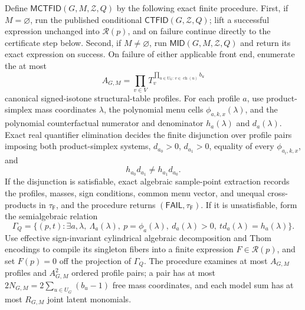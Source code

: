 Define \(\mathsf{MCTFID}(G,M,\mathcal Z,Q)\) by the following exact finite procedure.  First, if \(M=\varnothing\), run the published conditional \(\mathsf{CTFID}(G,\mathcal Z,Q)\); lift a successful expression unchanged into \(\mathcal R(p)\), and on failure continue directly to the certificate step below.  Second, if \(M\ne\varnothing\), run \(\mathsf{MID}(G,M,\mathcal Z,Q)\) and return its exact expression on success.  On failure of either applicable front end, enumerate the at most
\[
 A_{G,M}=\prod_{v\in V}T_v^{\prod_{u\in U_G:\,v\in\operatorname{ch}(u)}b_u}
\]
canonical signed-isotone structural-table profiles.  For each profile \(a\), use product-simplex mass coordinates \(\lambda\), the polynomial menu cells \(\phi_{a,k,x}(\lambda)\), and the polynomial counterfactual numerator and denominator \(h_a(\lambda)\) and \(d_a(\lambda)\).  Exact real quantifier elimination decides the finite disjunction over profile pairs imposing both product-simplex systems, \(d_{a_0}>0\), \(d_{a_1}>0\), equality of every \(\phi_{a_i,k,x}\), and
\[
 h_{a_0}d_{a_1}\ne h_{a_1}d_{a_0}.
\]
If the disjunction is satisfiable, exact algebraic sample-point extraction records the profiles, masses, sign conditions, common menu vector, and unequal cross-products in \(\tau_{\mathsf F}\), and the procedure returns \((\mathsf{FAIL},\tau_{\mathsf F})\).  If it is unsatisfiable, form the semialgebraic relation
\[
 \Gamma_Q=\{(p,t):\exists a,\lambda,\ \Lambda_a(\lambda),\ p=\phi_a(\lambda),\ d_a(\lambda)>0,\ t d_a(\lambda)=h_a(\lambda)\}.
\]
Use effective sign-invariant cylindrical algebraic decomposition and Thom encodings to compile its singleton fibers into a finite expression \(F\in\mathcal R(p)\), and set \(F(p)=0\) off the projection of \(\Gamma_Q\).  The procedure examines at most \(A_{G,M}\) profiles and \(A_{G,M}^2\) ordered profile pairs; a pair has at most \(2N_{G,M}=2\sum_{u\in U_G}(b_u-1)\) free mass coordinates, and each model sum has at most \(R_{G,M}\) joint latent monomials.